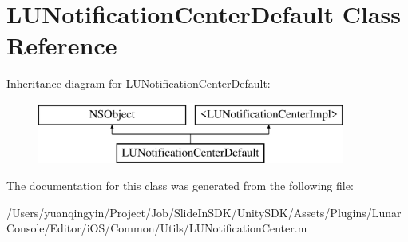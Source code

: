 \hypertarget{interface_l_u_notification_center_default}{}\section{L\+U\+Notification\+Center\+Default Class Reference}
\label{interface_l_u_notification_center_default}
Inheritance diagram for L\+U\+Notification\+Center\+Default\+:\begin{figure}[H]
\begin{center}
\leavevmode
\includegraphics[height=2.000000cm]{interface_l_u_notification_center_default}
\end{center}
\end{figure}


The documentation for this class was generated from the following file\+:\begin{DoxyCompactItemize}
\item 
/\+Users/yuanqingyin/\+Project/\+Job/\+Slide\+In\+S\+D\+K/\+Unity\+S\+D\+K/\+Assets/\+Plugins/\+Lunar\+Console/\+Editor/i\+O\+S/\+Common/\+Utils/L\+U\+Notification\+Center.\+m\end{DoxyCompactItemize}
